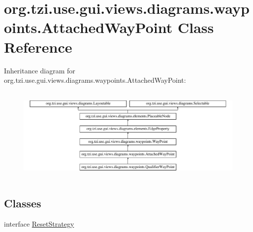 \hypertarget{classorg_1_1tzi_1_1use_1_1gui_1_1views_1_1diagrams_1_1waypoints_1_1_attached_way_point}{\section{org.\-tzi.\-use.\-gui.\-views.\-diagrams.\-waypoints.\-Attached\-Way\-Point Class Reference}
\label{classorg_1_1tzi_1_1use_1_1gui_1_1views_1_1diagrams_1_1waypoints_1_1_attached_way_point}
}
Inheritance diagram for org.\-tzi.\-use.\-gui.\-views.\-diagrams.\-waypoints.\-Attached\-Way\-Point\-:\begin{figure}[H]
\begin{center}
\leavevmode
\includegraphics[height=4.692738cm]{classorg_1_1tzi_1_1use_1_1gui_1_1views_1_1diagrams_1_1waypoints_1_1_attached_way_point}
\end{center}
\end{figure}
\subsection*{Classes}
\begin{DoxyCompactItemize}
\item 
interface \hyperlink{interfaceorg_1_1tzi_1_1use_1_1gui_1_1views_1_1diagrams_1_1waypoints_1_1_attached_way_point_1_1_reset_strategy}{Reset\-Strategy}
\end{DoxyCompactItemize}

